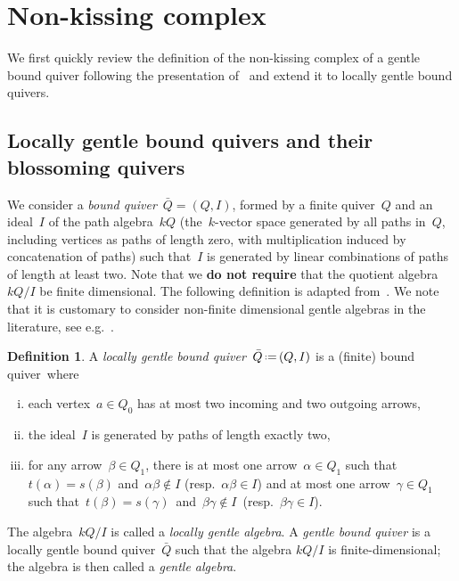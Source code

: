 \documentclass{amsart}
\theoremstyle{definition}
\newtheorem{definition}[theorem]{Definition}
\newcommand{\eqdef}{\mbox{\,\raisebox{0.2ex}{\scriptsize\ensuremath{\mathrm:}}\ensuremath{=}\,}} %
\newcommand{\darkblue}{\color{darkblue}} %
\newcommand{\defn}[1]{\textsl{\darkblue #1}} %
\begin{document}
\section{Non-kissing complex}\label{sec:nonKissingComplex}

\enlargethispage{.4cm}
We first quickly review the definition of the non-kissing complex of a gentle bound quiver following the presentation of~\cite{PaluPilaudPlamondon} and extend it to locally gentle bound quivers.

\subsection{Locally gentle bound quivers and their blossoming quivers}

We consider a \defn{bound quiver}~$\bar Q = (Q,I)$, formed by a finite quiver~$Q$ and an ideal~$I$ of the path algebra~$kQ$ (the~$k$-vector space generated by all paths in~$Q$, including vertices as paths of length zero, with multiplication induced by concatenation of paths) such that~$I$ is generated by linear combinations of paths of length at least two.
Note that we \textbf{do not require} that the quotient algebra~$kQ/I$ be finite dimensional.
The following definition is adapted from~\cite{ButlerRingel}. We note that it is customary to consider non-finite dimensional gentle algebras in the literature, see e.g.~\cite{Schroer}.

\begin{definition}
\label{def:gentleQuiver}
A \defn{locally gentle bound quiver}~$\bar Q \eqdef (Q,I)$ is a (finite) bound quiver~where
\begin{enumerate}[(i)]
\item each vertex~$a \in Q_0$ has at most two incoming and two outgoing arrows,
\item the ideal~$I$ is generated by paths of length exactly two,
\item for any arrow~$\beta \in Q_1$, there is at most one arrow~$\alpha \in Q_1$ such that~$t(\alpha) = s(\beta)$ and~${\alpha\beta\notin I}$ (resp.~$\alpha\beta \in I$) and at most one arrow~$\gamma \in Q_1$ such that~$t(\beta) = s(\gamma)$~and~${\beta\gamma\notin I}$~(resp.~${\beta\gamma \in I}$).
\end{enumerate}
The algebra~$kQ/I$ is called a \defn{locally gentle algebra}.
A \defn{gentle bound quiver} is a locally gentle bound quiver~$\bar Q$ such that the algebra $kQ/I$ is finite-dimensional; the algebra is then called a \defn{gentle algebra}.
\end{definition}
\end{document}
